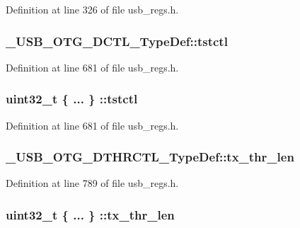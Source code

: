 Definition at line 326 of file usb\-\_\-regs.\-h.

\hypertarget{group___u_s_b___o_t_g___d_r_i_v_e_r_gaa3c8160005524429f22fe85d778f5dcc}{
\subsubsection[{tstctl}]{ \-\_\-\-U\-S\-B\-\_\-\-O\-T\-G\-\_\-\-D\-C\-T\-L\-\_\-\-Type\-Def\-::tstctl}}\label{group___u_s_b___o_t_g___d_r_i_v_e_r_gaa3c8160005524429f22fe85d778f5dcc}


Definition at line 681 of file usb\-\_\-regs.\-h.

\hypertarget{group___u_s_b___o_t_g___d_r_i_v_e_r_gaa5c922e0d22d9faaa717a1edc8a0263f}{
\subsubsection[{tstctl}]{\setlength{\rightskip}{0pt plus 5cm}uint32\-\_\-t \{ ... \} \-::tstctl}}\label{group___u_s_b___o_t_g___d_r_i_v_e_r_gaa5c922e0d22d9faaa717a1edc8a0263f}


Definition at line 681 of file usb\-\_\-regs.\-h.

\hypertarget{group___u_s_b___o_t_g___d_r_i_v_e_r_ga567c6393ecd2b93a7bb261d16f56543a}{
\subsubsection[{tx\-\_\-thr\-\_\-len}]{ \-\_\-\-U\-S\-B\-\_\-\-O\-T\-G\-\_\-\-D\-T\-H\-R\-C\-T\-L\-\_\-\-Type\-Def\-::tx\-\_\-thr\-\_\-len}}\label{group___u_s_b___o_t_g___d_r_i_v_e_r_ga567c6393ecd2b93a7bb261d16f56543a}


Definition at line 789 of file usb\-\_\-regs.\-h.

\hypertarget{group___u_s_b___o_t_g___d_r_i_v_e_r_gab220d4d79222998b003adc2d58ab78ba}{
\subsubsection[{tx\-\_\-thr\-\_\-len}]{\setlength{\rightskip}{0pt plus 5cm}uint32\-\_\-t \{ ... \} \-::tx\-\_\-thr\-\_\-len}}\label{group___u_s_b___o_t_g___d_r_i_v_e_r_gab220d4d79222998b003adc2d58ab78ba}


